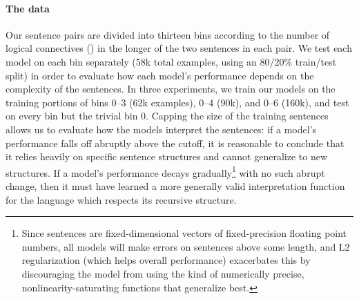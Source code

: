 \paragraph{The data}
Our sentence pairs are divided into thirteen bins according to the number of logical connectives () in the longer of the two sentences in each pair. We test each model on each bin separately (58k total examples, using an 80/20\% train/test split) in order to evaluate how each model's performance depends on the complexity of the sentences. In three experiments, we train our models on the training portions of bins 0--3 (62k examples), 0--4 (90k), and 0--6 (160k), and test on every bin but the trivial bin 0. Capping the size of the training sentences allows us to evaluate how the models interpret the sentences: if a model's performance falls off abruptly above the cutoff, it is reasonable to conclude that it relies heavily on specific sentence structures and cannot generalize to new structures. If a model's performance decays gradually\footnote{Since sentences are fixed-dimensional vectors of fixed-precision floating point numbers, all models will make errors on sentences above some length, and L2 regularization (which helps overall performance) exacerbates this by discouraging the model from using the kind of numerically precise, nonlinearity-saturating functions that generalize best.} with no such abrupt change, then it must have learned a more generally valid interpretation function for the language which respects its recursive structure.



